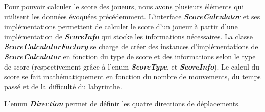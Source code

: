 Pour pouvoir calculer le score des joueurs, nous avons plusieurs éléments qui
utilisent les données évoquées précédemment. L'interface
\textbf{\textit{ScoreCalculator}} et ses implémentations permettent de calculer
le score d'un joueur à partir d'une implémentation de
\textbf{\textit{ScoreInfo}} qui stocke les informations nécessaires. La classe
\textbf{\textit{ScoreCalculatorFactory}} se charge de créer des instances
d'implémentations de \textbf{\textit{ScoreCalculator}} en fonction du type de
score et des informations selon le type de score (respectivement grâce à l'enum
\textbf{\textit{ScoreType}}, et \textbf{\textit{ScoreInfo}}). Le calcul du
score se fait mathématiquement en fonction du nombre de mouvements, du temps
passé et de la difficulté du labyrinthe.

L'enum \textbf{\textit{Direction}} permet de définir les quatre directions de
déplacements.
